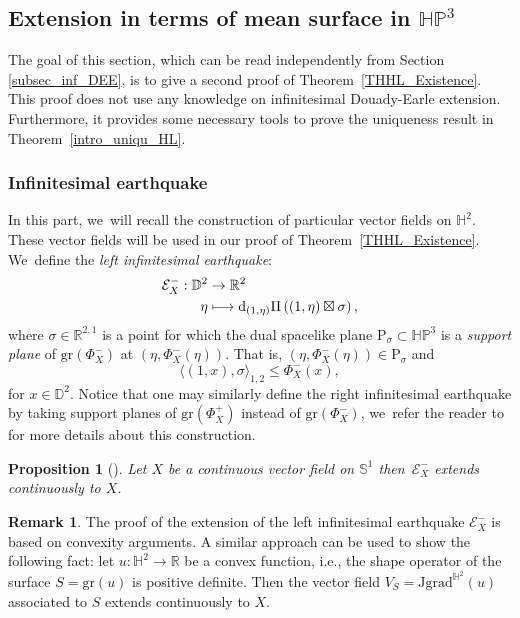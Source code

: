 \documentclass[11pt]{article}
\newcommand{\ie}{i.e.,\xspace}
\newcommand\mto{\mathchoice{\longmapsto}{\mapsto}{\mapsto}{\mapsto}}
\theoremstyle{plain}
\newtheorem{prop}[cor]{Proposition}
\theoremstyle{definition}
\newtheorem{remark}[cor]{Remark}
\newcommand{\HP}{\mathbb{HP}^3}
\newcommand{\grad}{\mathrm{grad}^{\mathbb{H}^2}}
\newcommand{\J}{\mathrm{J}}
\newcommand{\inner}[1] {\langle #1 \rangle}
\begin{document}
\subsection{Extension in terms of mean surface in \texorpdfstring{$\HP$}{HP}}\label{section_5.2_extension_mean_surface}
The goal of this section, which can be read independently from Section \ref{subsec_inf_DEE}, is to give a second proof of Theorem~\ref{THHL_Existence}. This proof does not use any knowledge on infinitesimal Douady-Earle extension. Furthermore, it provides some necessary tools to prove the uniqueness result in Theorem~\ref{intro_uniqu_HL}.

\subsubsection{Infinitesimal earthquake}\label{appendix6.1}
In this part, we~will recall the construction of particular vector fields on $\mathbb{H}^2$. These vector fields will be used in our proof of Theorem~\ref{THHL_Existence}. We~define the \emph{left infinitesimal earthquake}:
\begin{equation}\label{infearth_convexhull}
\begin{aligned}
\mathcal{E}_{X}^-: \mathbb{D}^2 & \to \mathbb{R}^2 \\
\eta & \mto \mathrm{d}_{(1,\eta)}\Pi\left((1,\eta)\boxtimes \sigma\right),
\end{aligned}
\end{equation}
where $\sigma \in \mathbb{R}^{2,1}$ is a point for which the dual spacelike plane $\mathrm{P}_{\sigma}\subset\HP$ is a \emph{support plane} of $\mathrm{gr}(\Phi_X^-)$ at $(\eta, \Phi_X^-(\eta))$. That is, $(\eta, \Phi_X^-(\eta)) \in \mathrm{P}_{\sigma}$ and
\[
\inner{(1,x),\sigma}_{1,2}\leq\Phi_X^-(x),
\]
for $x\in\mathbb{D}^2$. Notice that one may similarly define the right infinitesimal earthquake by taking support planes of $\mathrm{gr}(\Phi_X^+)$ instead of $\mathrm{gr}(\Phi_X^-)$, we~refer the reader to \cite{diaf2023Infearth} for more details about this construction.

\begin{prop}[{\cite[Prop.\,4.6]{diaf2023Infearth}}]\label{infinitesimal_earthquake_thm}
Let $X$ be a continuous vector field on $\mathbb{S}^1$ then~$\mathcal{E}_X^{-}$ extends continuously to $X$.
\end{prop}

\begin{remark}
The proof of the extension of the left infinitesimal earthquake $\mathcal{E}_X^-$ is based on convexity arguments. A similar approach can be used to show the following fact: let $u:\mathbb{H}^2\to\mathbb{R}$ be a convex function, \ie the shape operator of the surface $S=\mathrm{gr}(u)$ is positive definite. Then the vector field $V_S=\J\grad(u)$ associated to $S$ extends continuously to $X$.
\end{remark}
\end{document}
